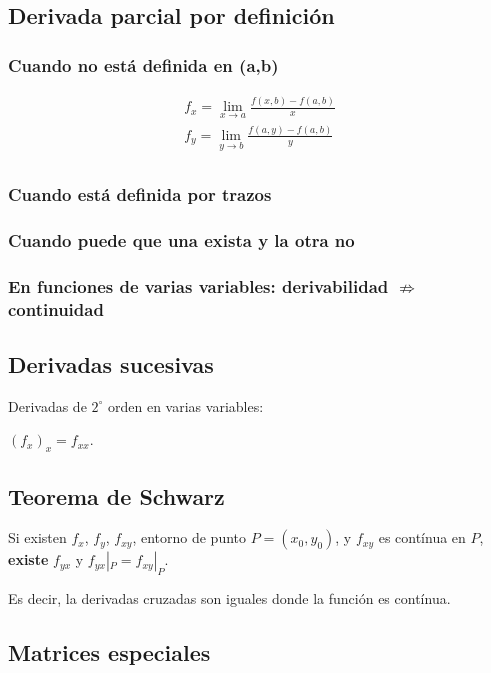 \subsection{Derivada parcial por definición}

\subsubsection{Cuando no está definida en (a,b)}

\begin{align*}
    f_x = \lim_{x \to a}\frac{f(x,b) - f(a,b)}{x} \\
    f_y = \lim_{y \to b}\frac{f(a,y) - f(a,b)}{y} \\
\end{align*}

\subsubsection{Cuando está definida por trazos}

\subsubsection{Cuando puede que una exista y la otra no}

\subsubsection{En funciones de varias variables: derivabilidad \(\nRightarrow\) continuidad}

\subsection{Derivadas sucesivas}

Derivadas de \(2^{\circ}\) orden en varias variables:

\((f_x)_x = f_{xx}\).

\subsection{Teorema de Schwarz}

Si existen \(f_x\),
\(f_y\),
\(f_{xy}\),
entorno de punto \(P=(x_0,y_0)\),
y \(f_{xy}\) es contínua en \(P\),
\textbf{existe} \(f_{yx}\) y \(f_{yx}|_P = f_{xy}|_P\).

Es decir,
la derivadas cruzadas son iguales donde la función es contínua.

\subsection{Matrices especiales}

